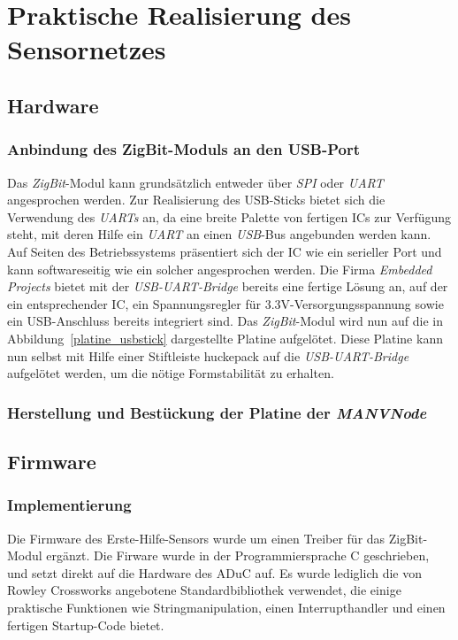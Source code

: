 
\chapter{Praktische Realisierung des Sensornetzes}

\section{Hardware}
\subsection{Anbindung des ZigBit-Moduls an den USB-Port}
Das \emph{ZigBit}-Modul kann grundsätzlich entweder über \emph{SPI} oder \emph{UART} angesprochen werden. 
Zur Realisierung des USB-Sticks bietet sich die Verwendung des \emph{UARTs} an, da eine breite Palette 
von fertigen ICs zur Verfügung steht, mit deren Hilfe ein \emph{UART} an einen \emph{USB}-Bus angebunden werden 
kann. Auf Seiten des Betriebssystems präsentiert sich der IC wie ein serieller Port und kann softwareseitig
wie ein solcher angesprochen werden. Die Firma \emph{Embedded Projects} bietet mit der \emph{USB-UART-Bridge}
bereits eine fertige Lösung an, auf der ein entsprechender IC, ein Spannungsregler für 3.3V-Versorgungsspannung
sowie ein USB-Anschluss bereits integriert sind. Das \emph{ZigBit}-Modul wird nun auf die in 
Abbildung~\ref{platine_usbstick} dargestellte Platine aufgelötet. Diese Platine kann nun selbst mit Hilfe einer
Stiftleiste huckepack auf die \emph{USB-UART-Bridge} aufgelötet werden, um die nötige Formstabilität zu erhalten.

\subsection{Herstellung und Bestückung der Platine der \emph{MANVNode}}

\section{Firmware}
\subsection{Implementierung}
Die Firmware des Erste-Hilfe-Sensors wurde um einen Treiber für das ZigBit-Modul ergänzt. Die Firware wurde in der
Programmiersprache C geschrieben, und setzt direkt auf die Hardware des ADuC auf. Es wurde lediglich die von 
Rowley Crossworks angebotene Standardbibliothek verwendet, die einige praktische Funktionen wie Stringmanipulation,
einen Interrupthandler und einen fertigen Startup-Code bietet.

